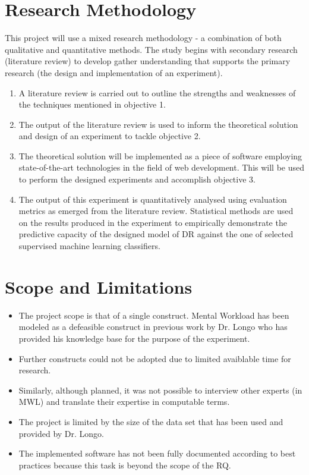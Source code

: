
\section{Research Methodology}

This project will use a mixed research methodology - a combination of both qualitative and quantitative methods. The study begins with secondary research (literature review) to develop gather understanding that supports the primary research (the design and implementation of an experiment).

\begin{enumerate}
  \item A literature review is carried out to outline the strengths and weaknesses of the techniques mentioned in objective 1.
  \item The output of the literature review is used to inform the theoretical solution and design of an experiment to tackle objective 2.
  \item The theoretical solution will be implemented as a piece of software employing state-of-the-art technologies in the field of web development. This will be used to perform the designed experiments and accomplish objective 3.
  \item  The output of this experiment is quantitatively analysed using evaluation metrics as emerged from the literature review. Statistical methods are used on the results produced in the experiment to empirically demonstrate the predictive capacity of the designed model of DR against the one of selected supervised machine learning classifiers.
\end{enumerate}


\section{Scope and Limitations}

\begin{itemize}
\item The project scope is that of a single construct. Mental Workload has been modeled as a defeasible construct in previous work by Dr. Longo who has provided his knowledge base for the purpose of the experiment. 
\item Further constructs could not be adopted due to limited avaiblable time for research. 
\item Similarly, although planned, it was not possible to interview other experts (in MWL) and translate their expertise in computable terms.
\item The project is limited by the size of the data set that has been used and provided by Dr. Longo.
\item The implemented software has not been fully documented according to best practices because this task is beyond the scope of the RQ.
\end{itemize}


